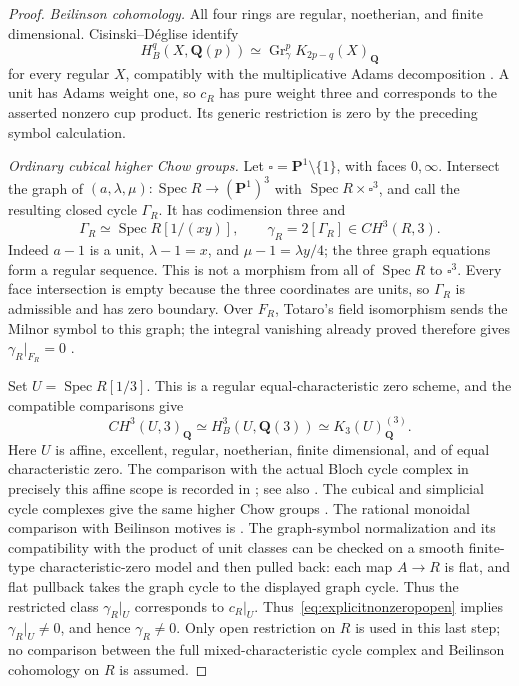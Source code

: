 \documentclass[11pt,a4paper]{article}
\theoremstyle{remark}
\begin{document}
\begin{proof}
\emph{Beilinson cohomology.}
All four rings are regular, noetherian, and finite dimensional.
Cisinski--D\'eglise identify
\[
 H_B^q(X,\mathbf Q(p))
 \simeq\operatorname{Gr}_\gamma^pK_{2p-q}(X)_{\mathbf Q}
\]
for every regular $X$, compatibly with the multiplicative Adams
decomposition \cite[Corollaries~14.2.14 and~14.2.19]{CisinskiDegliseMotives}.
A unit has Adams weight one, so $c_R$ has pure weight three and
corresponds to the asserted nonzero cup product. Its generic
restriction is zero by the preceding symbol calculation.

\emph{Ordinary cubical higher Chow groups.}
Let $\square=\mathbf P^1\setminus\{1\}$, with faces $0,\infty$.
Intersect the graph of
$(a,\lambda,\mu):\operatorname{Spec}R\to(\mathbf P^1)^3$ with
$\operatorname{Spec}R\times\square^3$, and call the resulting
closed cycle $\Gamma_R$. It has codimension three and
\[
 \Gamma_R\simeq\operatorname{Spec}R[1/(xy)],
 \qquad \gamma_R=2[\Gamma_R]\in CH^3(R,3).
\]
Indeed $a-1$ is a unit, $\lambda-1=x$, and
$\mu-1=\lambda y/4$; the three graph equations form a regular
sequence. This is not a morphism from all of $\operatorname{Spec}R$
to $\square^3$. Every face intersection is empty because the three
coordinates are units, so $\Gamma_R$ is admissible and has zero
boundary. Over $F_R$, Totaro's field isomorphism sends the Milnor
symbol to this graph; the integral vanishing already proved therefore
gives $\gamma_R|_{F_R}=0$
\cite[Theorem~1 and Sections~1--2]{TotaroMilnor}.

Set $U=\operatorname{Spec}R[1/3]$. This is a regular equal-characteristic
zero scheme, and the compatible comparisons give
\[
 CH^3(U,3)_{\mathbf Q}\simeq H_B^3(U,\mathbf Q(3))
       \simeq K_3(U)_{\mathbf Q}^{(3)}.
\]
Here $U$ is affine, excellent, regular, noetherian, finite dimensional,
and of equal characteristic zero. The comparison with the actual
Bloch cycle complex in precisely this affine scope is recorded in
\cite[Remark~1.3.2]{BondarkoIvanovChowWeights}; see also
\cite[Introduction~B, p.~xxii; Theorem~11.1.24 and
Examples~11.1.25 and~11.2.3]{CisinskiDegliseMotives}.
The cubical and simplicial cycle complexes give the same higher Chow
groups \cite[Theorem~4.7]{LevineHigherChowRevisited}.
The rational monoidal comparison with Beilinson motives is
\cite[Theorem~16.1.4 and Corollary~16.1.7]{CisinskiDegliseMotives}.
The graph-symbol normalization and its compatibility with the product
of unit classes can be checked on a smooth finite-type
characteristic-zero model and then pulled back: each map $A\to R$
is flat, and flat pullback takes the graph cycle to the displayed
graph cycle. Thus the restricted class $\gamma_R|_U$ corresponds to
$c_R|_U$.
Thus~\eqref{eq:explicitnonzeropopen} implies
$\gamma_R|_U\ne0$, and hence $\gamma_R\ne0$.
Only open restriction on $R$ is used in this last step; no comparison
between the full mixed-characteristic cycle complex and Beilinson
cohomology on $R$ is assumed.
\end{proof}
\end{document}
